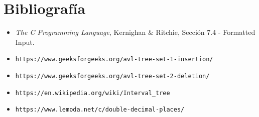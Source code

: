 \documentclass[11pt]{article}
\begin{document}
 \section{Bibliografía}
 \begin{itemize}
     \item \textit{The C Programming Language}, Kernighan \& Ritchie, Sección 7.4 - Formatted Input.
     \item \verb|https://www.geeksforgeeks.org/avl-tree-set-1-insertion/|
     \item \verb|https://www.geeksforgeeks.org/avl-tree-set-2-deletion/|
     \item \verb|https://en.wikipedia.org/wiki/Interval_tree|
     \item \verb|https://www.lemoda.net/c/double-decimal-places/|
 \end{itemize}
 
\end{document}
